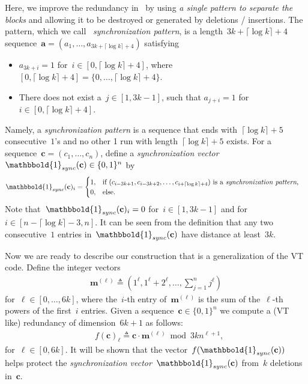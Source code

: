 \documentclass[10pt,a4paper,onecolumn]{IEEEtran}
\newcommand{\1}{\mathbbold{1}}
\newcommand{\bolda}{\mathbf{a}}
\newcommand{\boldc}{\mathbf{c}}
\newcommand{\boldm}{\mathbf{m}}
\begin{document}
Here, we improve the redundancy in~\cite{brakensiek2016efficient} by using \textit{a single pattern to separate the blocks} and allowing it to be destroyed or generated by deletions / insertions.  
The pattern, which we call~
\emph{synchronization pattern}, is a length~$3k+\lceil \log k\rceil +4$ sequence~$\bolda=(a_1,\ldots,a_{3k+\lceil \log k\rceil +4})$ satisfying
\begin{itemize}
    \item $a_{3k+i}=1$ for~$i\in[0,\lceil \log k\rceil +4]$, where~$[0,\lceil \log k\rceil +4]=\{0,\ldots, \lceil \log k\rceil +4\}$.
    \item There does not exist a~$j\in [1,3k-1]$, such that $a_{j+i}=1$ for~$i\in [0, \lceil \log k\rceil +4]$.
\end{itemize}
Namely, 
a \emph{synchronization pattern} is a sequence that ends with~$\lceil \log k\rceil +5$ consecutive~$1$'s and no other 1 run with length~$\lceil \log k\rceil +5$ exists.
For a sequence~$\boldc=(c_1,\ldots,c_n)$, define a \emph{synchronization vector}~$\1_{sync}(\boldc)\in\{0,1\}^n$ by
\begin{align*}
\1_{sync}(\boldc)_i &= \begin{cases}
1, &\text{if~$(c_{i-3k+1},c_{i-3k+2},\ldots,c_{i+\lceil \log k\rceil +4})$ is a \emph{synchronization pattern},}\\
0,&\text{else.}\\
\end{cases}
\end{align*}
Note that~$\1_{sync}(\boldc)_i=0$ for~$i\in [1,3k-1]$ and for~$i\in [n-\lceil \log k\rceil -3,n]$. 
It can be seen from the definition that any two consecutive~$1$ entries in~$\1_{sync}(\boldc)$ have distance at least~$3k$.

Now we are ready to describe our construction that is a generalization of the VT code. Define the integer vectors
\begin{align*}
    \boldm^{(\ell)}\triangleq (1^\ell,1^\ell+2^\ell,\ldots,\sum^n_{j=1}j^\ell)
\end{align*}
for~$\ell\in [0,\ldots,6k]$, where the~$i$-th entry of~$\boldm^{(\ell)}$ is the sum of the~$\ell$-th powers of the first~$i$ entries. 
Given a sequence~$\boldc\in \{0,1\}^n$ we compute a (VT like)  redundancy of dimension~$6k+1$ as follows:
\begin{align}\label{equation:deff}
    &f(\boldc)_{\ell}\triangleq \boldc \cdot \boldm^{(\ell)} \bmod 3kn^{\ell+1},
\end{align}
for~$\ell\in [0,6k]$.
It will be shown that
the vector~$f(\1_{sync}(\boldc))$ helps protect the \emph{synchronization vector}~$\1_{sync}(\boldc)$ from~$k$ deletions in~$\boldc$. 
\end{document}
